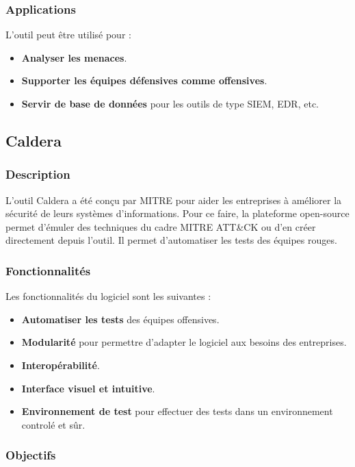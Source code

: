 \documentclass[12pt,letterpaper]{article}
\begin{document}
\subsubsection{Applications}

L'outil peut être utilisé pour :
\begin{itemize}
    \item \textbf{Analyser les menaces}.
    \item \textbf{Supporter les équipes défensives comme offensives}.
    \item \textbf{Servir de base de données} pour les outils de type SIEM, EDR, etc.
\end{itemize}

\subsection{Caldera}

\subsubsection{Description}

L'outil Caldera a été conçu par MITRE pour aider les entreprises à améliorer la sécurité de leurs systèmes d'informations.
Pour ce faire, la plateforme open-source permet d'émuler des techniques du cadre MITRE ATT\&CK ou d'en créer directement depuis l'outil.
Il permet d'automatiser les tests des équipes rouges.

\subsubsection{Fonctionnalités}

Les fonctionnalités du logiciel sont les suivantes :
\begin{itemize}
   \item \textbf{Automatiser les tests} des équipes offensives.
   \item \textbf{Modularité} pour permettre d'adapter le logiciel aux besoins des entreprises.
   \item \textbf{Interopérabilité}.
   \item \textbf{Interface visuel et intuitive}.
   \item \textbf{Environnement de test} pour effectuer des tests dans un environnement controlé et sûr.
\end{itemize}

\subsubsection{Objectifs}
\end{document}
